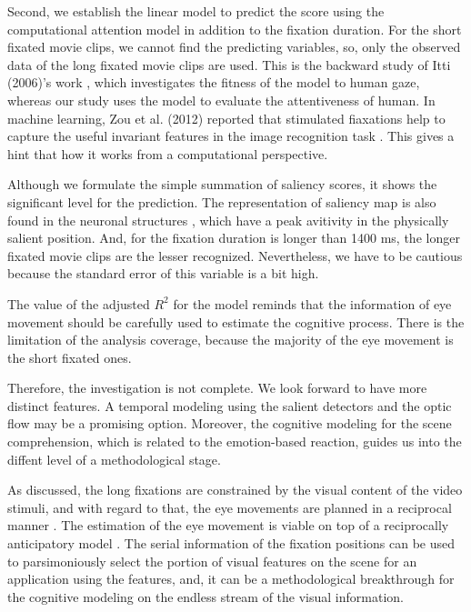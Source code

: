 \documentclass[oneside,master]{snueethesis}
\begin{document}
Second, we establish the linear model to predict the score using the computational attention model \cite{itti1998model} in addition to the fixation duration. For the short fixated movie clips, we cannot find the predicting variables, so, only the observed data of the long fixated movie clips are used. This is the backward study of Itti (2006)’s work \cite{Itti2006}, which investigates the fitness of the model to human gaze, whereas our study uses the model to evaluate the attentiveness of human. In machine learning, Zou et al. (2012) reported that stimulated fiaxations help to capture the useful invariant features in the image recognition task \cite{Zou2012}. This gives a hint that how it works from a computational perspective.

Although we formulate the simple summation of saliency scores, it shows the significant level for the prediction. The representation of saliency map is also found in the neuronal structures \cite{Fecteau2006}, which have a peak avitivity in the physically salient position. And, for the fixation duration is longer than 1400 ms, the longer fixated movie clips are the lesser recognized. Nevertheless, we have to be cautious because the standard error of this variable is a bit high. 

The value of the adjusted $R^{2}$ for the model reminds that the information of eye movement should be carefully used to estimate the cognitive process. There is the limitation of the analysis coverage, because the majority of the eye movement is the short fixated ones. 

Therefore, the investigation is not complete. We look forward to have more distinct features. A temporal modeling using the salient detectors \cite{marr1980,canny1986} and the optic flow \cite{koenderink1986} may be a promising option. Moreover, the cognitive modeling for the scene comprehension, which is related to the emotion-based reaction, guides us into the diffent level of a methodological stage. 

As discussed, the long fixations are constrained by the visual content of the video stimuli, and with regard to that, the eye movements are planned in a reciprocal manner \cite{zhang2013}. The estimation of the eye movement is viable on top of a reciprocally anticipatory model \cite{robert1985anticipatory}. The serial information of the fixation positions can be used to parsimoniously select the portion of visual features on the scene for an application using the features, and, it can be a methodological breakthrough for the cognitive modeling on the endless stream of the visual information.
\end{document}
